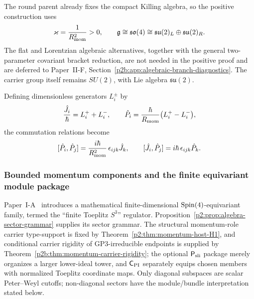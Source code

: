 \documentclass[12pt,a4paper]{article}
\begin{document}
\begin{remark}
\label{p2:rem:compact-branch}
The round parent already fixes the compact Killing algebra, so the positive
construction uses
\[
 \varkappa=\frac{1}{R_{\mathrm{mom}}^2}>0,
 \qquad
 \mathfrak g\cong\mathfrak{so}(4)
 \cong\mathfrak{su}(2)_L\oplus\mathfrak{su}(2)_R.
\]
The flat and Lorentzian algebraic alternatives, together with the general
two-parameter covariant bracket reduction, are not needed in the positive
proof and are deferred to Paper~II-F, Section~\ref{p2b:app:algebraic-branch-diagnostics}.
The carrier group itself remains \(SU(2)\), with Lie algebra
\(\mathfrak{su}(2)\).
\end{remark}

Defining dimensionless generators $L_i^\pm$ by
\[
\frac{\hat J_i}{\hbar}=L_i^+ + L_i^-,
\qquad
\hat P_i = \frac{\hbar}{R_{\mathrm{mom}}}\bigl(L_i^+ - L_i^-\bigr),
\]
the commutation relations become
\begin{equation}
\label{p2:eq:pp-correct}
[\hat P_i,\hat P_j] = \frac{i\hbar}{R_{\mathrm{mom}}^2}\,\epsilon_{ijk}\hat J_k,
\qquad
[\hat J_i,\hat P_j] = i\hbar\,\epsilon_{ijk}\hat P_k.
\end{equation}

\subsubsection{Bounded momentum components and the finite equivariant module package}
\label{p2:sec:fuzzy-truncation}

Paper~I-A~\cite{Kugelmann2026a} introduces a mathematical finite-dimensional
\(\mathrm{Spin}(4)\)-equivariant family, termed the ``finite Toeplitz \(S^3\)''
regulator.  Proposition~\ref{p2:prop:algebra-sector-grammar} supplies its
sector grammar.  The structural momentum-role carrier type-support is fixed by
Theorem~\ref{p2:thm:momentum-host-H1}, and conditional carrier rigidity of GP3-irreducible
endpoints is supplied by Theorem~\ref{p2b:thm:momentum-carrier-rigidity}; the optional
\(\mathsf P_{\rm sli}\) package merely organizes a larger lower-ideal tower,
and \(\mathsf C_{\rm PI}\) separately equips chosen members with normalized
Toeplitz coordinate maps.  Only diagonal subspaces are scalar Peter--Weyl
cutoffs; non-diagonal sectors have the module/bundle interpretation stated
below.
\end{document}
